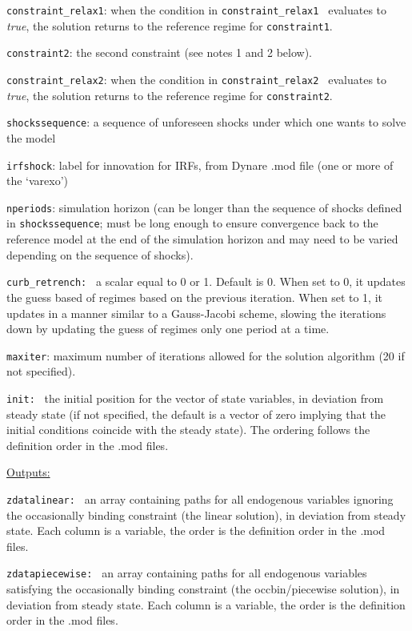 \documentclass[12pt]{article}
\begin{document}
\begin{enumerate}
\texttt{constraint\_relax1}: when the condition in \texttt{constraint\_relax1%
} evaluates to \emph{true}, the solution returns to the reference regime for 
\texttt{constraint1}.

\texttt{constraint2}: the second constraint (see notes 1 and 2 below).

\texttt{constraint\_relax2}: when the condition in \texttt{constraint\_relax2%
} evaluates to \emph{true}, the solution returns to the reference regime for 
\texttt{constraint2}.

\texttt{shockssequence}: a sequence of unforeseen shocks under which one
wants to solve the model

\texttt{irfshock}: label for innovation for IRFs, from Dynare .mod file (one
or more of the `varexo')

\texttt{nperiods}: simulation horizon (can be longer than the sequence of
shocks defined in \texttt{shockssequence}; must be long enough to ensure
convergence back to the reference model at the end of the simulation horizon
and may need to be varied depending on the sequence of shocks).

\texttt{curb\_retrench: } a scalar equal to 0 or 1. Default is 0. When set
to 0, it updates the guess based of regimes based on the previous iteration.
When set to 1, it updates in a manner similar to a Gauss-Jacobi scheme,
slowing the iterations down by updating the guess of regimes only one period
at a time.

\texttt{maxiter}: maximum number of iterations allowed for the solution
algorithm (20 if not specified).

\texttt{init: } the initial position for the vector of state variables, in
deviation from steady state (if not specified, the default is a vector of
zero implying that the initial conditions coincide with the steady state).
The ordering follows the definition order in the .mod files.

\underline{Outputs:}

\texttt{zdatalinear:\ } an array containing paths for all endogenous
variables ignoring the occasionally binding constraint (the linear
solution), in deviation from steady state. Each column is a variable, the
order is the definition order in the .mod files.

\texttt{zdatapiecewise:\ } an array containing paths for all endogenous
variables satisfying the occasionally binding constraint (the
occbin/piecewise solution), in deviation from steady state. Each column is a
variable, the order is the definition order in the .mod files.


\end{enumerate}
\end{document}
